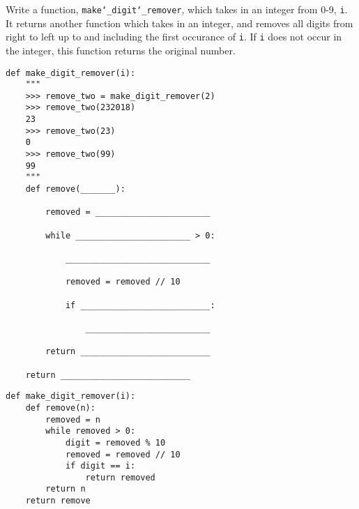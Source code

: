 \begin{blocksection}
\question Write a function, \texttt{make\char`_digit\char`_remover}, which takes in an integer from 0-9, \texttt{i}. It returns another function which takes in an integer, and removes all digits from right to left up to and including the first occurance of \texttt{i}. If \texttt{i} does not occur in the integer, this function returns the original number. \\

\begin{lstlisting}
def make_digit_remover(i):
    """
    >>> remove_two = make_digit_remover(2)
    >>> remove_two(232018)
    23
    >>> remove_two(23)
    0
    >>> remove_two(99)
    99
    """
    def remove(_______):

    	removed = _______________________

        while _______________________ > 0:

            _____________________________

            removed = removed // 10

            if __________________________:

                _________________________

        return __________________________

    return __________________________
\end{lstlisting}

\end{blocksection}

\begin{blocksection}
\begin{solution}
\begin{lstlisting}
def make_digit_remover(i):
    def remove(n):
        removed = n
        while removed > 0:
            digit = removed % 10
            removed = removed // 10
            if digit == i:
                return removed
        return n
    return remove
\end{lstlisting}
\end{solution}
\end{blocksection}
